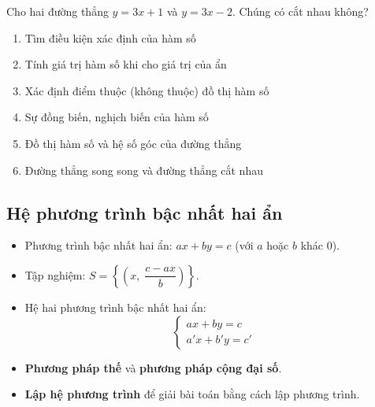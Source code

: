 \documentclass[12pt,a4paper]{article}
\begin{document}
\begin{vidu}
  Cho hai đường thẳng $y = 3x + 1$ và $y = 3x - 2$. Chúng có cắt nhau không?
\end{vidu}

\begin{enumerate}[label=\textbf{Dạng \arabic*:}, leftmargin=*, align=left]
  \item Tìm điều kiện xác định của hàm số
  \item Tính giá trị hàm số khi cho giá trị của ẩn
  \item Xác định điểm thuộc (không thuộc) đồ thị hàm số
  \item Sự đồng biến, nghịch biến của hàm số
  \item Đồ thị hàm số và hệ số góc của đường thẳng
  \item Đường thẳng song song và đường thẳng cắt nhau
\end{enumerate}

\subsection{Hệ phương trình bậc nhất hai ẩn}

\begin{dinhnghia}
  \begin{itemize}
    \item Phương trình bậc nhất hai ẩn: $ax + by = c$ \quad (với $a$ hoặc $b$ khác $0$).
    \item Tập nghiệm: $S = \left\{\!\left(x,\; \dfrac{c - ax}{b}\right)\right\}$.
    \item Hệ hai phương trình bậc nhất hai ẩn:
    \[\begin{cases} ax + by = c \\ a'x + b'y = c' \end{cases}\]
  \end{itemize}
\end{dinhnghia}

\begin{phuongphap}
  \begin{itemize}
    \item \textbf{Phương pháp thế} và \textbf{phương pháp cộng đại số}.
    \item \textbf{Lập hệ phương trình} để giải bài toán bằng cách lập phương trình.
  \end{itemize}
\end{phuongphap}
\end{document}
